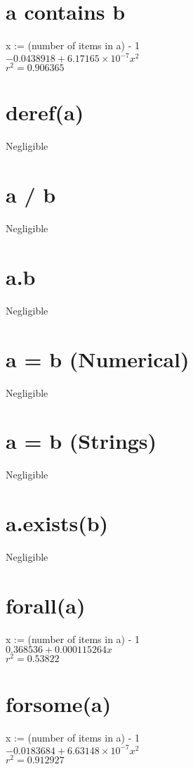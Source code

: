 \documentclass[12pt]{article}
\begin{document}
	\section{a contains b}
	x := (number of items in a) - 1\\
	$-0.0438918 + 6.17165 \times 10^{-7} x^2$\\
	$r^2 = 0.906365$
	
	\section{deref(a)}
	Negligible
	
	\section{a / b}
	Negligible
	
	\section{a.b}
	Negligible
	
	\section{a = b (Numerical)}
	Negligible
	
	\section{a = b (Strings)}
	Negligible
	
	\section{a.exists(b)}
	Negligible
	
	\section{forall(a)}
	x := (number of items in a) - 1\\
	$0.368536 + 0.000115264 x$\\
	$r^2 = 0.53822$
	
	\section{forsome(a)}
	x := (number of items in a) - 1\\
	$-0.0183684 + 6.63148 \times 10^{-7} x^2$\\
	$r^2 = 0.912927$
	
\end{document}
